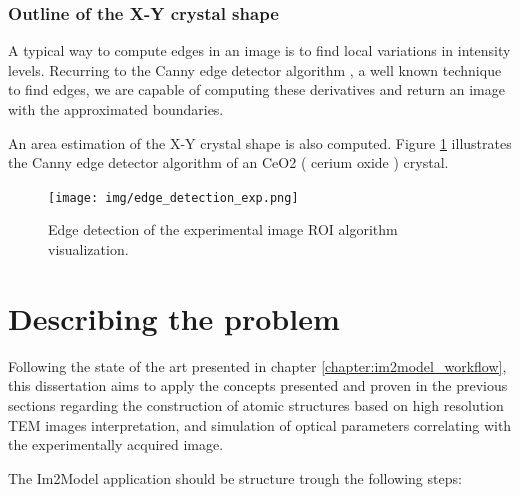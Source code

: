 \documentclass[
  oneside,
  11pt, a4paper,
  footinclude=true,
  headinclude=true,
  cleardoublepage=empty
]{scrbook}
\begin{document}
\subsubsection{Outline of the X-Y crystal shape}


A typical way to compute edges in an image is to find local variations in intensity levels.
Recurring to the Canny edge detector algorithm \citep{canny1986computational}, a well known technique to find edges, we are capable of computing these derivatives and return an image with the approximated boundaries. \par
An area estimation of the X-Y crystal shape is also computed. Figure \ref{fig:edge_detection_exp} illustrates the Canny edge detector algorithm of an CeO2 ( cerium oxide ) crystal. 

\begin{figure}[!ht]
	\begin{center}
	
	\texttt{[image: img/edge\_detection\_exp.png]}
			\caption[Edge detection of the experimental image ROI algorithm visualization]{
			Edge detection of the experimental image ROI algorithm visualization.}
	\label{fig:edge_detection_exp}
		\end{center}
	\end{figure}
	
		\section{Describing the problem}
		
	

Following the state of the art presented in chapter \ref{chapter:im2model_workflow}, this dissertation aims to apply the concepts presented and proven in the previous sections regarding the construction of atomic structures based on high resolution TEM images interpretation, and simulation of optical parameters correlating with the experimentally acquired image.



The Im2Model application should be structure trough the following steps:
\end{document}
